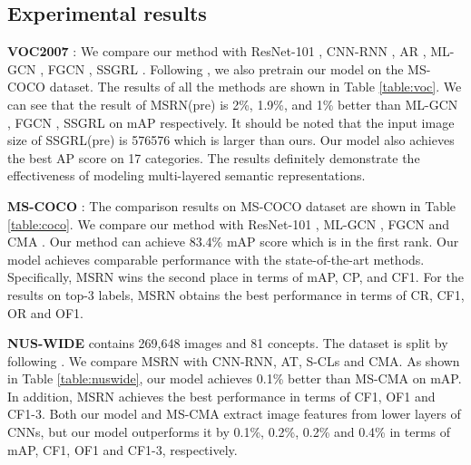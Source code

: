 \documentclass{article} \usepackage{nips14submit_e,times}
\begin{document}
\subsection{Experimental results}
\noindent\textbf{VOC2007} \cite{voc2007}: We compare our method with ResNet-101 \cite{ResNet}, CNN-RNN \cite{CVPR2016:ULMIC}, AR \cite{AAAI2018:RARL}, ML-GCN \cite{CVPR2019:ML-GCN}, FGCN \cite{CIKM2020:FGCN}, SSGRL \cite{ICCV2019:ssgrl}.
Following \cite{ICCV2019:ssgrl}, we also pretrain our model on the MS-COCO dataset.
The results of all the methods are shown in Table \ref{table:voc}.
We can see that the result of MSRN(pre) is 2\%, 1.9\%, and 1\% better than ML-GCN \cite{CVPR2019:ML-GCN}, FGCN \cite{CIKM2020:FGCN}, SSGRL \cite{ICCV2019:ssgrl} on mAP respectively.
It should be noted that the input image size of SSGRL(pre) is 576576 which is larger than ours.
Our model also achieves the best AP score on 17 categories.
The results definitely demonstrate the effectiveness of modeling multi-layered semantic representations.

\noindent\textbf{MS-COCO} \cite{coco2014}: The comparison results on MS-COCO dataset are shown in Table \ref{table:coco}.
We compare our method with ResNet-101 \cite{ResNet}, ML-GCN \cite{CVPR2019:ML-GCN}, FGCN \cite{CIKM2020:FGCN} and CMA \cite{AAAI2020:CMA}.
Our method can achieve 83.4\% mAP score which is in the first rank.
Our model achieves comparable performance with the state-of-the-art methods.
Specifically, MSRN wins the second place in terms of mAP, CP, and CF1.
For the results on top-3 labels, MSRN obtains the best performance in terms of CR, CF1, OR and OF1.



\noindent\textbf{NUS-WIDE} \cite{Nuswide2009} contains 269,648 images and 81 concepts. The dataset is split by following \cite{AAAI2020:CMA}.
We compare MSRN with CNN-RNN\cite{CVPR2016:ULMIC},
AT\cite{ICLR2017:AT}, S-CLs\cite{CVPR2018:KDWD} and CMA\cite{AAAI2020:CMA}.
As shown in Table \ref{table:nuswide}, our model achieves 0.1\% better than MS-CMA on mAP.
In addition, MSRN achieves the best performance in terms of CF1, OF1 and CF1-3.
Both our model and MS-CMA\cite{AAAI2020:CMA} extract image features from lower layers of CNNs,
but our model outperforms it by 0.1\%, 0.2\%, 0.2\% and 0.4\% in terms of mAP, CF1, OF1 and CF1-3, respectively.
\end{document}
